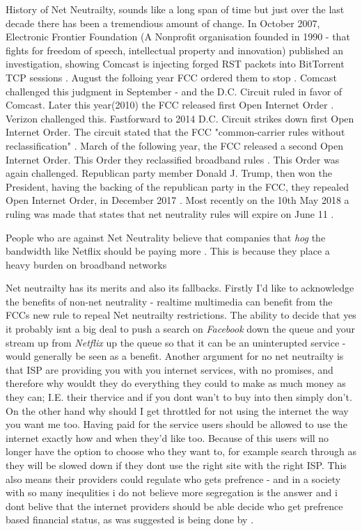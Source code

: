 \documentclass[11pt,a4paper]{newrucsthesis}
\renewcommand {\cite} {\citep}  %
\begin{document}
History of Net Neutrailty, sounds like a long span of time but just over the last decade there has been a tremendious amount of change. In October 2007,  Electronic Frontier Foundation (A Nonprofit organisation founded in 1990 - that fights for freedom of speech, intellectual property and innovation) published an investigation, showing Comcast is injecting forged RST packets into BitTorrent TCP sessions \cite{jeremy2018}. August the folloing year FCC ordered them to stop \cite{jeremy2018}. Comcast challenged this judgment in September - and the D.C. Circuit ruled in favor of Comcast. Later this year(2010) the FCC released first Open Internet Order \cite{jeremy2018}. Verizon challenged this. Fastforward to 2014 D.C. Circuit strikes down first Open Internet Order. The circuit stated that the FCC "common-carrier rules without reclassification" \cite{jeremy2018}. March of the following year, the FCC released a second Open Internet Order. This Order they reclassified broadband rules \cite{jeremy2018}. This Order was again challenged\cite{jeremy2018}. Republican party member Donald J. Trump, then won the President, having the backing of the republican party in the FCC, they repealed Open Internet Order, in December 2017 \cite{jeremy2018}. Most recently on the 10th May 2018 a ruling was made that states that net neutrality rules will expire on June 11 \cite{history}. 

People who are against Net Neutrality believe that companies that \textit{hog} the bandwidth like Netflix should be paying  more \cite{jeremy2018}. This is because they place a heavy burden on broadband networks \cite{jeremy2018}


Net neutrailty has its merits and also its fallbacks. Firstly I'd like to acknowledge the benefits of non-net neutrality - realtime multimedia can benefit from the FCCs new rule to repeal Net neutrailty restrictions. The ability to decide that yes it probably isnt a big deal to push a search on \textit{Facebook} down the queue and your stream up from \textit{Netflix} up the queue so that it can be an uninterupted service - would generally be seen as a benefit. Another argument for no net neutrailty is that ISP are providing you with you internet services, with no promises, and therefore why wouldt they do everything they could to make as much money as they can; I.E. their thervice and if you dont wan't to buy into then simply don't.\\ 
On the other hand why should I get throttled for not using the internet the way you want me too. Having paid for the service users should be allowed to use the internet exactly how and when they'd like too. Because of this users will no longer have the option to choose who they want to, for example search through as they will be slowed down if they dont use the right site with the right ISP. This also means their providers could regulate who gets prefrence - and in a society with so many inequlities i do not believe more segregation is the answer and i dont belive that the internet providers should be able decide who get prefrence based financial status, as was suggested is being done by \citet{clark2018}. 
\end{document}
